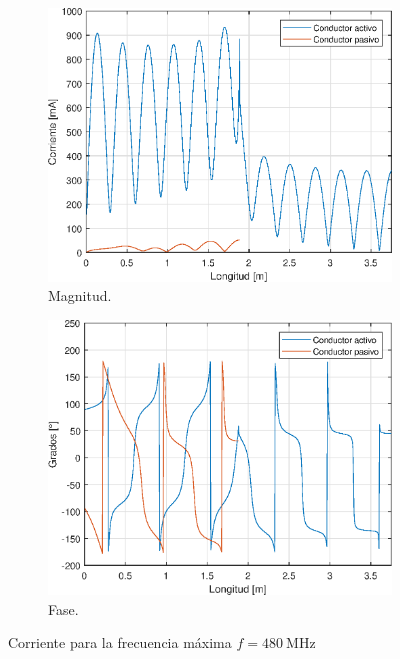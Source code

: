 \begin{figure}[H]
\begin{subfigure}{0.5\textwidth}
		\includegraphics[scale=0.6]{imagenes/i_mag_480_tierra.eps}
		\caption{Magnitud.}
	\end{subfigure}
	\quad
	\begin{subfigure}{0.5\textwidth}
		\includegraphics[scale=0.6]{imagenes/i_fase_480_tierra.eps}
		\caption{Fase.}
	\end{subfigure}
	\caption{Corriente para la frecuencia máxima $f = \SI{480}{\mega\hertz}$}
\end{figure}
